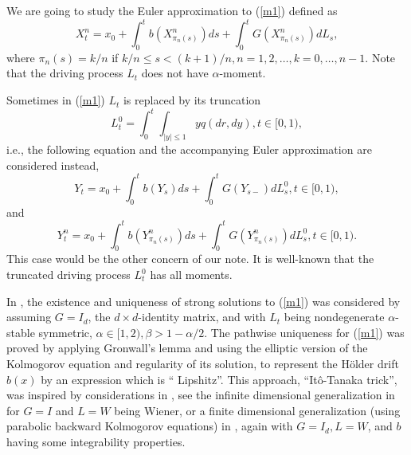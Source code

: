\documentclass[11pt]{amsart}
\theoremstyle{plain}
\numberwithin{equation}{section}
\begin{document}
We are going to study the Euler approximation to (\ref{m1}) defined as 
\begin{equation}
X_{t}^{n}=x_{0}+\int_{0}^{t}b\left( X_{\pi _{n}\left( s\right) }^{n}\right)
ds+\int_{0}^{t}G\left( X_{\pi _{n}\left( s\right) }^{n}\right) dL_{s},
\label{m2}
\end{equation}where $\pi _{n}\left( s\right) =k/n$ if $k/n\leq s<(k+1)/n,n=1,2,\ldots
,k=0,\ldots ,n-1.$ Note that the driving process $L_{t}$ does not have $\alpha $-moment.

Sometimes in (\ref{m1}) $L_{t}$ is replaced by its truncation\begin{equation*}
L_{t}^{0}=\int_{0}^{t}\int_{\left\vert y\right\vert \leq 1}yq\left(
dr,dy\right) ,t\in \lbrack 0,1),
\end{equation*}i.e., the following equation and the accompanying Euler approximation are
considered instead, 
\begin{equation}
Y_{t}=x_{0}+\int_{0}^{t}b\left( Y_{s}\right) ds+\int_{0}^{t}G\left(
Y_{s-}\right) dL_{s}^{0},t\in \lbrack 0,1),  \label{m1'}
\end{equation}and\begin{equation}
Y_{t}^{n}=x_{0}+\int_{0}^{t}b\left( Y_{\pi _{n}\left( s\right) }^{n}\right)
ds+\int_{0}^{t}G\left( Y_{\pi _{n}\left( s\right) }^{n}\right)
dL_{s}^{0},t\in \lbrack 0,1).  \label{m2'}
\end{equation}This case would be the other concern of our note. It is well-known that the
truncated driving process $L_{t}^{0}$ has all moments.

In \cite{p}, the existence and uniqueness of strong solutions to (\ref{m1})
was considered by assuming $G=I_{d}$, the $d\times d$-identity matrix, and
with $L_{t}$ being nondegenerate $\alpha $-stable symmetric, $\alpha \in
\lbrack 1,2),\beta >1-\alpha /2$. The pathwise uniqueness for (\ref{m1}) was
proved by applying Gronwall's lemma and using the elliptic version of the
Kolmogorov equation and regularity of its solution, to represent the H\"{o}lder drift $b\left( x\right) $ by an expression which is \textquotedblleft
Lipshitz\textquotedblright. This approach, \textquotedblleft It\^{o}-Tanaka
trick\textquotedblright, was inspired by considerations in \cite{fp}, see
the infinite dimensional generalization in \cite{dp} for $G=I$ and $L=W$
being Wiener, or a finite dimensional generalization (using parabolic
backward Kolmogorov equations) in \cite{ff}, again with $G=I_{d},L=W $, and $b$ having some integrability properties.
\end{document}
